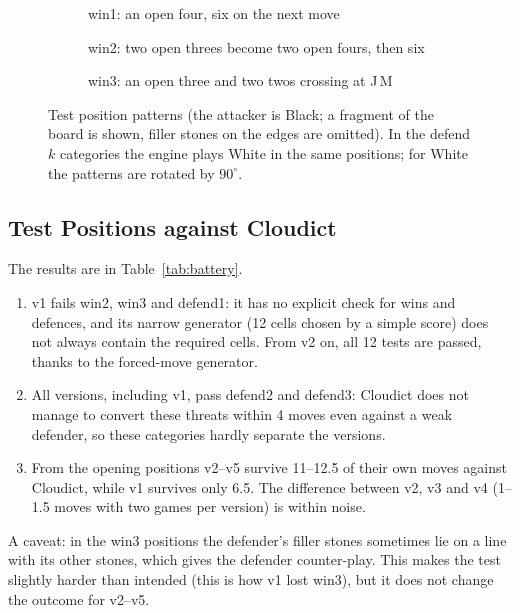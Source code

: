 \documentclass[a4paper,10pt,twocolumn]{article}
\newenvironment{points}{\begin{enumerate}[label=(\arabic*),leftmargin=*,itemsep=2pt,topsep=3pt]}{\end{enumerate}}
\newcommand{\board}[4]{%
  \fill[board] (#1-0.6,-#3+0.6) rectangle (#2+0.6,-#4-0.6);
  \foreach \c in {#1,...,#2} {\draw[black!60,line width=0.3pt] (\c,-#3) -- (\c,-#4);
     \node[font=\tiny,above] at (\c,-#3+0.45) {\pgfmathparse{int(\c+64)}\char\pgfmathresult};}
  \foreach \r in {#3,...,#4} {\draw[black!60,line width=0.3pt] (#1,-\r) -- (#2,-\r);
     \node[font=\tiny,left] at (#1-0.45,-\r) {\pgfmathparse{int(\r+64)}\char\pgfmathresult};}
}
\newcommand{\B}[2]{\node[bstone] at (#1,-#2) {};}
\newcommand{\W}[2]{\node[wstone] at (#1,-#2) {};}
\begin{document}
\begin{figure}[t]
\centering
\begin{subfigure}[b]{0.32\textwidth}\centering
{}
\caption{win1: an open four, six on the next move}
\end{subfigure}\hfill
\begin{subfigure}[b]{0.32\textwidth}\centering
{}
\caption{win2: two open threes become two open fours, then six}
\end{subfigure}\hfill
\begin{subfigure}[b]{0.32\textwidth}\centering
{}
\caption{win3: an open three and two twos crossing at J\,M}
\end{subfigure}
\caption{Test position patterns (the attacker is Black; a fragment of the board is shown, filler stones on the edges are omitted). In the defend$k$ categories the engine plays White in the same positions; for White the patterns are rotated by $90^\circ$.}
\label{fig:positions}
\end{figure}

\subsection{Test Positions against Cloudict}
The results are in Table~\ref{tab:battery}.
\begin{points}
\item v1 fails win2, win3 and defend1: it has no explicit check for wins and defences, and its narrow generator (12 cells chosen by a simple score) does not always contain the required cells. From v2 on, all 12 tests are passed, thanks to the forced-move generator.
\item All versions, including v1, pass defend2 and defend3: Cloudict does not manage to convert these threats within 4 moves even against a weak defender, so these categories hardly separate the versions.
\item From the opening positions v2--v5 survive 11--12.5 of their own moves against Cloudict, while v1 survives only 6.5. The difference between v2, v3 and v4 (1--1.5 moves with two games per version) is within noise.
\end{points}
A caveat: in the win3 positions the defender's filler stones sometimes lie on a line with its other stones, which gives the defender counter-play. This makes the test slightly harder than intended (this is how v1 lost win3), but it does not change the outcome for v2--v5.
\end{document}
